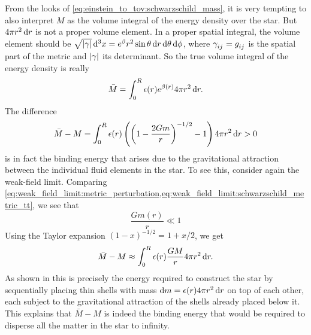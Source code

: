 From the looks of \cref{eq:einstein_to_tov:schwarzschild_mass}, it is very tempting to also interpret $M$ as the volume integral of the energy density over the star.
But $4 \pi r^2 \dif r$ is not a proper volume element.
In a proper spatial integral, the volume element should be $\sqrt{\abs{\gamma}} \dif^3 x = e^\beta r^2 \sin \theta \dif r \dif \theta \dif \phi$, where $\gamma\indices{_i_j} = g\indices{_i_j}$ is the spatial part of the metric and $\abs{\gamma}$ its determinant.
So the true volume integral of the energy density is really
\begin{equation*}
	\bar{M} = \integral{\epsilon(r) e^{\beta(r)} 4 \pi r^2}{r}{0}{R}.
\end{equation*}
The difference
\begin{equation*}
	\bar{M} - M = \integral{\epsilon(r) \left( \left( 1-\frac{2Gm}{r} \right)^{-1/2} - 1 \right) 4 \pi r^2}{r}{0}{R} > 0
\end{equation*}
is in fact the binding energy that arises due to the gravitational attraction between the individual fluid elements in the star.
To see this, consider again the weak-field limit.
Comparing \cref{eq:weak_field_limit:metric_perturbation,eq:weak_field_limit:schwarzschild_metric_tt}, we see that
\begin{equation}
	\frac{G m(r)}{r} \ll 1
	\label{eq:weak_field_limit:small_gmr}
\end{equation}
Using the Taylor expansion $(1 - x)^{-1/2} = 1 + x/2$, we get
\begin{equation}
	\bar{M} - M \approx \integral{\epsilon(r) \frac{GM}{r} 4 \pi r^2}{r}{0}{R} .
\end{equation}
As shown in \cite[exercise 23.7]{ref:mtw} this is precisely the energy required to construct the star by sequentially placing thin shells with mass $\dif m = \epsilon(r) 4 \pi r^2 \dif r$ on top of each other, each subject to the gravitational attraction of the shells already placed below it.
This explains that $\bar{M} - M$ is indeed the binding energy that would be required to disperse all the matter in the star to infinity.

